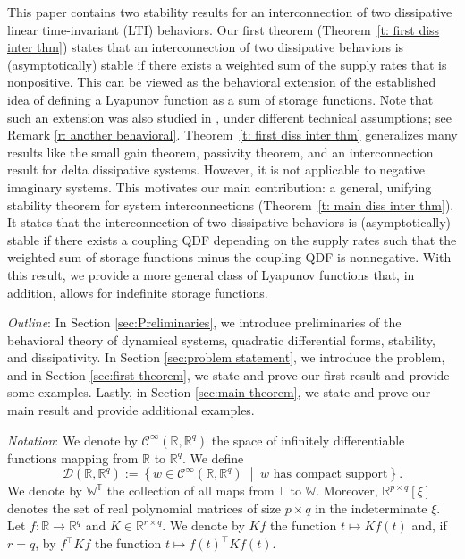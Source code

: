 \documentclass[letterpaper, 10 pt, conference]{ieeeconf}
\theoremstyle{ieeeconf}
\newcommand{\R}{\mathbb{R}}
\newcommand{\set}[2]{\left\{ #1 \;\middle| \; #2 \right\}}
\begin{document}
This paper contains two stability results for an interconnection of two dissipative linear time-invariant (LTI) behaviors. Our first theorem (Theorem~\ref{t: first diss inter thm}) states that an interconnection of two dissipative behaviors is (asymptotically) stable if there exists a weighted sum of the supply rates that is nonpositive. This can be viewed as the behavioral extension of the established idea of defining a Lyapunov function as a sum of storage functions. Note that such an extension was also studied in \cite{takaba_stability_2005}, under different technical assumptions; see Remark \ref{r: another behavioral}. 
Theorem~\ref{t: first diss inter thm} generalizes many results like the small gain theorem, passivity theorem, and an interconnection result for delta dissipative systems. However, it is not applicable to negative imaginary systems. This motivates our main contribution: a general, unifying stability theorem for system interconnections (Theorem~\ref{t: main diss inter thm}). It states that the interconnection of two dissipative behaviors is (asymptotically) stable if there exists a coupling QDF depending on the supply rates such that the weighted sum of storage functions minus the coupling QDF is nonnegative. With this result, we provide a more general class of Lyapunov functions that, in addition, allows for indefinite storage functions. 

\emph{Outline}: In Section \ref{sec:Preliminaries}, we introduce preliminaries of the behavioral theory of dynamical systems, quadratic differential forms, stability, and dissipativity. In Section \ref{sec:problem statement}, we introduce the problem, and in Section \ref{sec:first theorem}, we state and prove our first result and provide some examples. Lastly, in Section \ref{sec:main theorem}, we state and prove our main result and provide additional examples.

\emph{Notation}:
We denote by ${\mathcal{C}^\infty(\R,\R^q)}$ the space of infinitely differentiable functions mapping from $\R$ to $\R^q$. We define
\begin{equation*}
\mathcal{D}(\R,\R^q):=\set{w \in \mathcal{C}^\infty(\R,\R^q)}{w \text{ has compact support}}.
\end{equation*}We denote by $\mathbb{W}^{\mathbb{T}}$ the collection of all maps from $\mathbb{T}$ to $\mathbb{W}$. 
Moreover, ${\R^{p \times q}[\xi]}$ denotes the set of real polynomial matrices of size $p \times q$ in the indeterminate $\xi$.
Let $f : \R \to \R^q$ and $K \in \R^{r \times q}$. We denote by $Kf$ the function $t \mapsto Kf(t)$ and, if $r=q$, by $f^\top Kf$ the function $t\mapsto f(t)^\top Kf(t)$.
\end{document}
